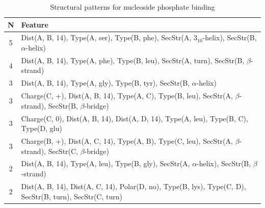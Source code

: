 \documentclass[11pt,twoside,a4paper]{book}
\begin{document}
\begin{table}\begin{tabularx}{\textwidth}{cX}\textbf{N} & \textbf{Feature} \\ \hline  
5 & Dist(A, B, 14),  Type(A, ser), Type(B, phe), SecStr(A, $3_{10}$-helix), SecStr(B, $\alpha$-helix)\\ \hline 
4 & Dist(A, B, 14),  Type(A, phe), Type(B, leu), SecStr(A, turn), SecStr(B, $\beta$-strand)\\ \hline 
3 & Dist(A, B, 14),  Type(A, gly), Type(B, tyr), SecStr(B, $\alpha$-helix)\\ \hline 
3 & Charge(C, +), Dist(A, B, 14),  Type(A, C), Type(B, leu), SecStr(A, $\beta$-strand), \newline SecStr(B, $\beta$-bridge)\\ \hline 
3 & Charge(C, 0), Dist(A, B, 14), Dist(A, D, 14),  Type(A, leu), Type(B, C), \newline Type(D, glu)\\ \hline 
3 & Charge(B, +), Dist(A, C, 14),  Type(A, B), Type(C, leu), SecStr(A, $\beta$-strand), \newline SecStr(C, $\beta$-bridge)\\ \hline 
2 & Dist(A, B, 14),  Type(A, leu), Type(B, gly), SecStr(A, $\alpha$-helix), SecStr(B, $\beta$-strand)\\ \hline 
2 & Dist(A, B, 14), Dist(A, C, 14), Polar(D, no),  Type(B, lys), Type(C, D), \newline SecStr(B, turn), SecStr(C, turn)\\ \hline 
 \end{tabularx}\caption{Structural patterns for nucleoside phosphate binding}\label{tab:nucleoside_phosphate_binding}\end{table}
\end{document}
